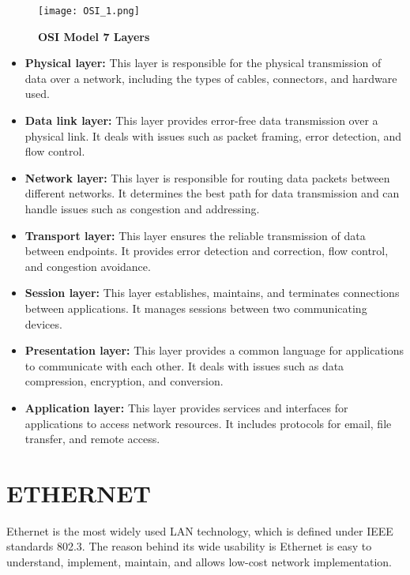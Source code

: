 \documentclass[12pt]{article}
\begin{document}
 \begin{figure}[ht]
\centering
\texttt{[image: OSI\_1.png]}
\caption{\textbf{OSI Model 7 Layers}}
\label{OSI_block}
\end{figure}

\begin{itemize}

\item \textbf{Physical layer:} This layer is responsible for the physical transmission of data over a network, including the types of cables, connectors, and hardware used.

\item \textbf{Data link layer:} This layer provides error-free data transmission over a physical link. It deals with issues such as packet framing, error detection, and flow control.

\item \textbf{Network layer:} This layer is responsible for routing data packets between different networks. It determines the best path for data transmission and can handle issues such as congestion and addressing.

\item \textbf{Transport layer:} This layer ensures the reliable transmission of data between endpoints. It provides error detection and correction, flow control, and congestion avoidance.

\item \textbf{Session layer:} This layer establishes, maintains, and terminates connections between applications. It manages sessions between two communicating devices.

\item \textbf{Presentation layer:} This layer provides a common language for applications to communicate with each other. It deals with issues such as data compression, encryption, and conversion.

\item \textbf{Application layer:} This layer provides services and interfaces for applications to access network resources. It includes protocols for email, file transfer, and remote access.
\end{itemize}

\section{ETHERNET}
Ethernet is the most widely used LAN technology, which is defined under IEEE standards 802.3. The reason behind its wide usability is Ethernet is easy to understand, implement, maintain, and allows low-cost network implementation.
\end{document}
